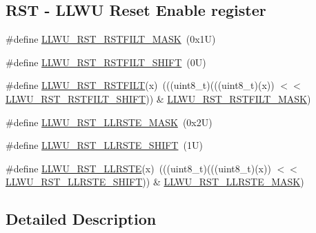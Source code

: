 \subsection*{R\+ST -\/ L\+L\+WU Reset Enable register}
\begin{DoxyCompactItemize}
\item 
\#define \mbox{\hyperlink{group___l_l_w_u___register___masks_ga6a909bf1d49bb4f85ad988396fe928f2}{L\+L\+W\+U\+\_\+\+R\+S\+T\+\_\+\+R\+S\+T\+F\+I\+L\+T\+\_\+\+M\+A\+SK}}~(0x1\+U)
\item 
\#define \mbox{\hyperlink{group___l_l_w_u___register___masks_gaaa76fead204f735855760c2f071ac11f}{L\+L\+W\+U\+\_\+\+R\+S\+T\+\_\+\+R\+S\+T\+F\+I\+L\+T\+\_\+\+S\+H\+I\+FT}}~(0\+U)
\item 
\#define \mbox{\hyperlink{group___l_l_w_u___register___masks_gaa13d0a0ebfdd0939b1ba9ae0a8843dec}{L\+L\+W\+U\+\_\+\+R\+S\+T\+\_\+\+R\+S\+T\+F\+I\+LT}}(x)~(((uint8\+\_\+t)(((uint8\+\_\+t)(x)) $<$$<$ \mbox{\hyperlink{group___l_l_w_u___register___masks_gaaa76fead204f735855760c2f071ac11f}{L\+L\+W\+U\+\_\+\+R\+S\+T\+\_\+\+R\+S\+T\+F\+I\+L\+T\+\_\+\+S\+H\+I\+FT}})) \& \mbox{\hyperlink{group___l_l_w_u___register___masks_ga6a909bf1d49bb4f85ad988396fe928f2}{L\+L\+W\+U\+\_\+\+R\+S\+T\+\_\+\+R\+S\+T\+F\+I\+L\+T\+\_\+\+M\+A\+SK}})
\item 
\#define \mbox{\hyperlink{group___l_l_w_u___register___masks_ga9c57c7139b6659782c0a5e160b790c3e}{L\+L\+W\+U\+\_\+\+R\+S\+T\+\_\+\+L\+L\+R\+S\+T\+E\+\_\+\+M\+A\+SK}}~(0x2\+U)
\item 
\#define \mbox{\hyperlink{group___l_l_w_u___register___masks_gaf1c8b75e71d3086612da4e1e2f768d72}{L\+L\+W\+U\+\_\+\+R\+S\+T\+\_\+\+L\+L\+R\+S\+T\+E\+\_\+\+S\+H\+I\+FT}}~(1\+U)
\item 
\#define \mbox{\hyperlink{group___l_l_w_u___register___masks_gad8091af3da5e3220b82e3de8adc2a45e}{L\+L\+W\+U\+\_\+\+R\+S\+T\+\_\+\+L\+L\+R\+S\+TE}}(x)~(((uint8\+\_\+t)(((uint8\+\_\+t)(x)) $<$$<$ \mbox{\hyperlink{group___l_l_w_u___register___masks_gaf1c8b75e71d3086612da4e1e2f768d72}{L\+L\+W\+U\+\_\+\+R\+S\+T\+\_\+\+L\+L\+R\+S\+T\+E\+\_\+\+S\+H\+I\+FT}})) \& \mbox{\hyperlink{group___l_l_w_u___register___masks_ga9c57c7139b6659782c0a5e160b790c3e}{L\+L\+W\+U\+\_\+\+R\+S\+T\+\_\+\+L\+L\+R\+S\+T\+E\+\_\+\+M\+A\+SK}})
\end{DoxyCompactItemize}


\subsection{Detailed Description}


